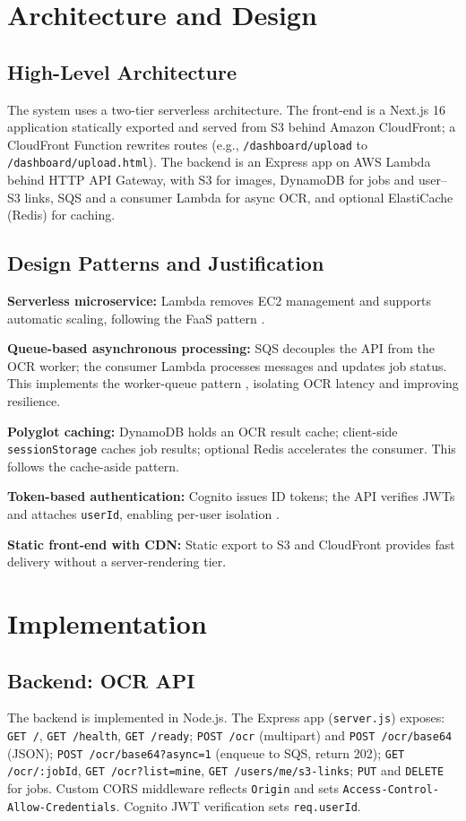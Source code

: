 \documentclass[conference]{IEEEtran}
\begin{document}
\section{Architecture and Design}

\subsection{High-Level Architecture}
The system uses a two-tier serverless architecture. The front-end is a Next.js 16 application statically exported and served from S3 behind Amazon CloudFront; a CloudFront Function rewrites routes (e.g., \texttt{/dashboard/upload} to \texttt{/dashboard/upload.html}). The backend is an Express app on AWS Lambda behind HTTP API Gateway, with S3 for images, DynamoDB for jobs and user--S3 links, SQS and a consumer Lambda for async OCR, and optional ElastiCache (Redis) for caching.

\subsection{Design Patterns and Justification}
\textbf{Serverless microservice:} Lambda removes EC2 management and supports automatic scaling, following the FaaS pattern \cite{aws-lambda}.

\textbf{Queue-based asynchronous processing:} SQS decouples the API from the OCR worker; the consumer Lambda processes messages and updates job status. This implements the worker-queue pattern \cite{eip}, isolating OCR latency and improving resilience.

\textbf{Polyglot caching:} DynamoDB holds an OCR result cache; client-side \texttt{sessionStorage} caches job results; optional Redis accelerates the consumer. This follows the cache-aside pattern.

\textbf{Token-based authentication:} Cognito issues ID tokens; the API verifies JWTs and attaches \texttt{userId}, enabling per-user isolation \cite{cognito}.

\textbf{Static front-end with CDN:} Static export to S3 and CloudFront provides fast delivery without a server-rendering tier.

\section{Implementation}

\subsection{Backend: OCR API}
The backend is implemented in Node.js. The Express app (\texttt{server.js}) exposes: \texttt{GET /}, \texttt{GET /health}, \texttt{GET /ready}; \texttt{POST /ocr} (multipart) and \texttt{POST /ocr/base64} (JSON); \texttt{POST /ocr/base64?async=1} (enqueue to SQS, return 202); \texttt{GET /ocr/:jobId}, \texttt{GET /ocr?list=mine}, \texttt{GET /users/me/s3-links}; \texttt{PUT} and \texttt{DELETE} for jobs. Custom CORS middleware reflects \texttt{Origin} and sets \texttt{Access-Control-Allow-Credentials}. Cognito JWT verification sets \texttt{req.userId}.
\end{document}
